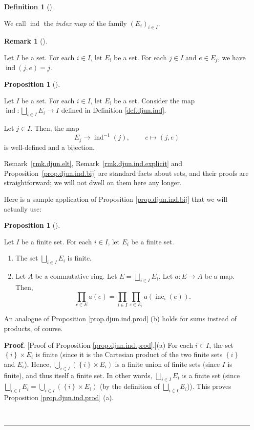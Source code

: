 \documentclass[numbers=enddot,12pt,final,onecolumn,notitlepage,abstracton]{scrartcl}
\theoremstyle{definition}
\newtheorem{prop}[theo]{Proposition}
\newenvironment{proposition}[1][]
{\begin{prop}[#1]\begin{leftbar}}
{\end{leftbar}\end{prop}}
\newtheorem{defi}[theo]{Definition}
\newenvironment{definition}[1][]
{\begin{defi}[#1]\begin{leftbar}}
{\end{leftbar}\end{defi}}
\newtheorem{remk}[theo]{Remark}
\newenvironment{remark}[1][]
{\begin{remk}[#1]\begin{leftbar}}
{\end{leftbar}\end{remk}}
\newenvironment{proof}[1][Proof]{\noindent\textbf{#1.} }{\ \rule{0.5em}{0.5em}}
\let\prodnonlimits\prod
\let\cupnonlimits\bigcup
\renewcommand{\prod}{\prodnonlimits\limits}
\renewcommand{\bigcup}{\cupnonlimits\limits}
\newenvironment{verlong}{}{}
\begin{document}
\begin{verlong}
\begin{footnotesize}
\begin{definition}
We call $\operatorname*{ind}$ the \textit{index map} of the family $\left(
E_{i}\right)  _{i\in I}$.
\end{definition}

\begin{remark}
\label{rmk.djun.ind.explicit}Let $I$ be a set. For each $i\in I$, let $E_{i}$
be a set. For each $j\in I$ and $e\in E_{j}$, we have $\operatorname*{ind}%
\left(  j,e\right)  =j$.
\end{remark}

\begin{proposition}
\label{prop.djun.ind.bij}Let $I$ be a set. For each $i\in I$, let $E_{i}$ be a
set. Consider the map $\operatorname*{ind}:\bigsqcup_{i\in I}E_{i}\rightarrow
I$ defined in Definition \ref{def.djun.ind}.

Let $j\in I$. Then, the map%
\[
E_{j}\rightarrow\operatorname*{ind}\nolimits^{-1}\left(  j\right)
,\ \ \ \ \ \ \ \ \ \ e\mapsto\left(  j,e\right)
\]
is well-defined and a bijection.
\end{proposition}

Remark~\ref{rmk.djun.elt}, Remark~\ref{rmk.djun.ind.explicit} and
Proposition~\ref{prop.djun.ind.bij} are standard facts about sets, and their
proofs are straightforward; we will not dwell on them here any longer.

Here is a sample application of Proposition \ref{prop.djun.ind.bij} that we
will actually use:

\begin{proposition}
\label{prop.djun.ind.prod}Let $I$ be a finite set. For each $i\in I$, let
$E_{i}$ be a finite set.

\begin{enumerate}
\item[(a)] The set $\bigsqcup_{i\in I}E_{i}$ is finite.

\item[(b)] Let $A$ be a commutative ring. Let $E = \bigsqcup_{i\in I}E_{i}$.
Let $a:E\rightarrow A$ be a map. Then,%
\[
\prod_{e\in E}a\left(  e\right)  =\prod_{i\in I}\prod_{e\in E_{i}}a\left(
\operatorname*{inc}\nolimits_{i}\left(  e\right)  \right)  .
\]

\end{enumerate}
\end{proposition}

An analogue of Proposition \ref{prop.djun.ind.prod} (b) holds for sums instead
of products, of course.

\begin{proof}
[Proof of Proposition \ref{prop.djun.ind.prod}.](a) For each $i\in I$, the set
$\left\{  i\right\}  \times E_{i}$ is finite (since it is the Cartesian
product of the two finite sets $\left\{  i\right\}  $ and $E_{i}$). Hence,
$\bigcup_{i\in I}\left(  \left\{  i\right\}  \times E_{i}\right)  $ is a
finite union of finite sets (since $I$ is finite), and thus itself a finite
set. In other words, $\bigsqcup_{i\in I}E_{i}$ is a finite set (since
$\bigsqcup_{i\in I}E_{i}=\bigcup_{i\in I}\left(  \left\{  i\right\}  \times
E_{i}\right)  $ (by the definition of $\bigsqcup_{i\in I}E_{i}$)). This proves
Proposition \ref{prop.djun.ind.prod} (a).


\end{proof}
\end{footnotesize}
\end{verlong}
\end{document}
